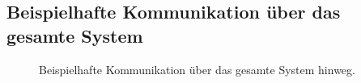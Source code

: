 \subsection{Beispielhafte Kommunikation über das gesamte System}\label{ExCom}
\begin{figure}[H]
\centering
{}
\caption{Beispielhafte Kommunikation über das gesamte System hinweg.}
\label{fig:KomGes}
\end{figure}